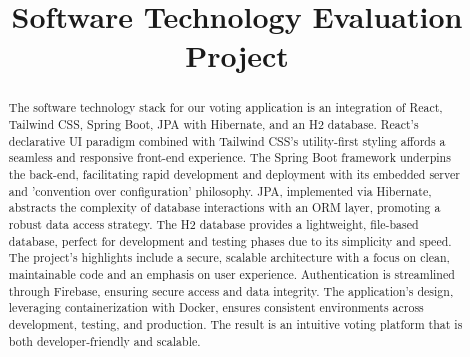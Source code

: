 \documentclass[11pt]{article}
\begin{document}
\title{Software Technology Evaluation Project}

\maketitle

\begin{abstract}
The software technology stack for our voting application is an integration of React, Tailwind CSS, Spring Boot, JPA with Hibernate, and an H2 database. React's declarative UI paradigm combined with Tailwind CSS's utility-first styling affords a seamless and responsive front-end experience. The Spring Boot framework underpins the back-end, facilitating rapid development and deployment with its embedded server and 'convention over configuration' philosophy. JPA, implemented via Hibernate, abstracts the complexity of database interactions with an ORM layer, promoting a robust data access strategy. The H2 database provides a lightweight, file-based database, perfect for development and testing phases due to its simplicity and speed. The project's highlights include a secure, scalable architecture with a focus on clean, maintainable code and an emphasis on user experience. Authentication is streamlined through Firebase, ensuring secure access and data integrity. The application's design, leveraging containerization with Docker, ensures consistent environments across development, testing, and production. The result is an intuitive voting platform that is both developer-friendly and scalable.
\end{abstract}

%














\end{document}

